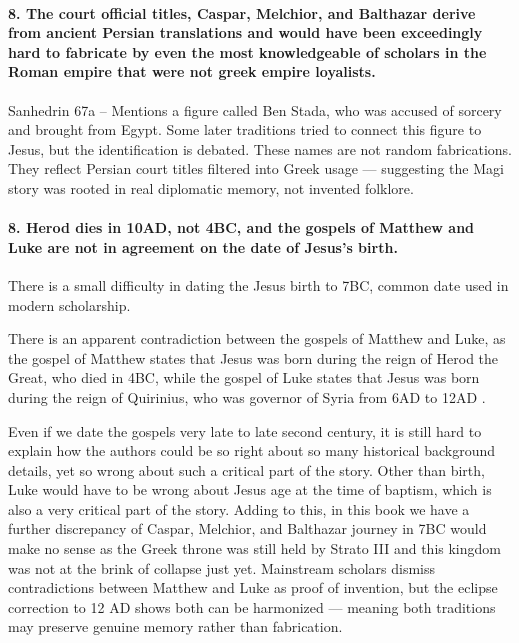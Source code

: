 \paragraph{8.
The court official titles, Caspar, Melchior, and Balthazar derive from ancient Persian translations and would have been exceedingly hard to fabricate by even the most knowledgeable of scholars in the Roman empire that were not greek empire loyalists.}\label{par:the-court-official-titles-caspar-melchior-and-balthazar-derive-from-ancient-persian-translations-and-would-have-been-exceedingly-hard-to-fabricate-by-even-the-most-knowledgeable-of-scholars-in-the-roman-empire-that-were-not-greek-empire-loyalists.}

Sanhedrin 67a -- Mentions a figure called Ben Stada, who was accused of sorcery and brought from Egypt.
Some later traditions tried to connect this figure to Jesus, but the identification is debated.
These names are not random fabrications.
They reflect Persian court titles filtered into Greek usage — suggesting the Magi story was rooted in real diplomatic memory, not invented folklore.

\paragraph{8.
Herod dies in 10AD, not 4BC, and the gospels of Matthew and Luke are not in agreement on the date of Jesus's birth.}\label{par:herod-dies-in-10ad-not-4bc-and-the-gospels-of-matthew-and-luke-are-not-in-agreement-on-the-date-of-jesuss-birth.}

There is a small difficulty in dating the Jesus birth to 7BC, common date used in modern scholarship.

There is an apparent contradiction between the gospels of Matthew and Luke, as the gospel of Matthew states that Jesus was born during the reign of Herod the Great, who died in 4BC, while the gospel of Luke states that Jesus was born during the reign of Quirinius, who was governor of Syria from 6AD to 12AD .

Even if we date the gospels very late to late second century, it is still hard to explain how the authors could be so right about so many historical background details, yet so wrong about such a critical part of the story.
Other than birth, Luke would have to be wrong about Jesus age at the time of baptism, which is also a very critical part of the story.
Adding to this, in this book we have a further discrepancy of Caspar, Melchior, and Balthazar journey in 7BC would make no sense as the Greek throne was still held by Strato III and this kingdom was not at the brink of collapse just yet.
Mainstream scholars dismiss contradictions between Matthew and Luke as proof of invention, but the eclipse correction to 12 AD shows both can be harmonized — meaning both traditions may preserve genuine memory rather than fabrication.

